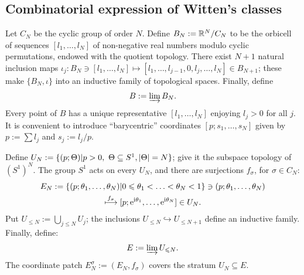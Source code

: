 \subsection{Combinatorial expression of Witten's classes}
\label{sec:wittens-classes-comb}
Let $C_N$ be the cyclic group of order $N$. Define $B_N := \setR^N / C_N$
to be the orbicell of sequences $[l_1, \ldots, l_N]$ of non-negative real
numbers modulo cyclic permutations, endowed with the quotient
topology. There exist $N+1$ natural inclusion maps $\iota_j: B_N \ni [l_1,
\ldots, l_N] \mapsto [l_1, \ldots, l_{j-1}, 0, l_j, \ldots, l_N] \in B_{N+1}$; these
make $\{B_N, \iota\}$ into an inductive family of topological spaces.
Finally, define
\begin{equation*}
  B := \varinjlim B_N.
\end{equation*}
Every point of $B$ has a unique representative $[l_1, \ldots, l_N]$
enjoying $l_j > 0$ for all $j$. It is convenient to introduce
``barycentric'' coordinates $[p; s_1, \ldots, s_N]$ given by $p := \sum l_j$
and $s_j := l_j/p$.

Define $U_N := \{ (p; \Theta) | p>0, \ \Theta\subseteq S^1, \card{\Theta} = N\}$; give it
the subspace topology of $(S^1)^N$. The group $S^1$ acts on every
$U_N$, and there are surjections $f_\sigma$, for $\sigma \in C_N$:
\begin{multline*}
  E_N := \{ (p; \theta_1, \ldots, \theta_N) | 0\leq \theta_1 < \ldots < \theta_N < 1\} \ni (p;
  \theta_1, \ldots, \theta_N) 
  \\
  \stackrel{f_\sigma}{\longmapsto} [p; \E^{\I\theta_1}, \ldots,
  \E^{\I\theta_N}] \in U_N.
\end{multline*}
Put $U_{\leq N} := \bigcup_{j \leq N} U_j$; the inclusions $U_{\leq N} \hookrightarrow U_{\leq
  N+1}$ define an inductive family. Finally, define:
\begin{equation*}
  E := \varinjlim U_{\leq N}.
\end{equation*}
The coordinate patch $E^\sigma_N := (E_N, f_\sigma)$ covers the stratum $U_N
\subseteq E$.

